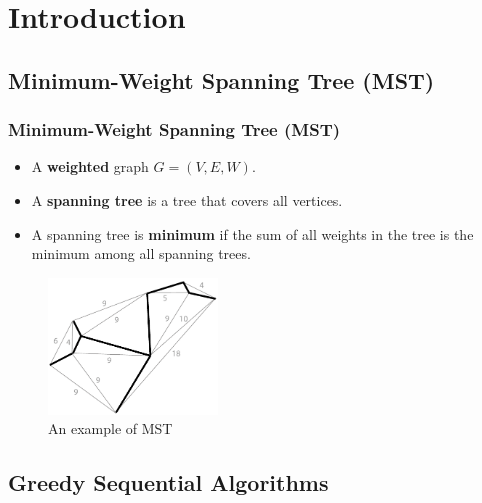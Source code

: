 \section{Introduction}

\subsection{Minimum-Weight Spanning Tree (MST)}

\begin{frame}
\frametitle{Minimum-Weight Spanning Tree (MST)}

\begin{itemize}
  \item A \textbf{weighted} graph $G = (V,E,W)$.
  \item A \textbf{spanning tree} is a tree that covers all vertices.
  \item A spanning tree is \textbf{minimum} if the sum of all weights in the tree is the minimum among all spanning trees.
\end{itemize}
\begin{figure}
    \centering
    \includegraphics[width=0.4\textwidth]{figures/mst.pdf}
    \caption{An example of MST}
\end{figure}
\end{frame}

\subsection{Greedy Sequential Algorithms}

